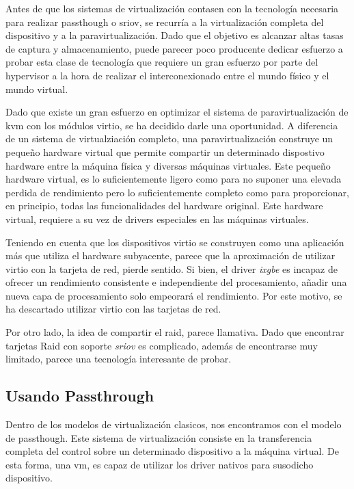 Antes de que los sistemas de virtualización contasen con la tecnología necesaria para realizar \gls{passthough} o \gls{sriov}, se recurría a la virtualización completa del dispositivo y a la paravirtualización. Dado que el objetivo es alcanzar altas tasas de captura y almacenamiento, puede parecer poco producente dedicar esfuerzo a probar esta clase de tecnología que requiere un gran esfuerzo por parte del hypervisor a la hora de realizar el interconexionado entre el mundo físico y el mundo virtual.

Dado que existe un gran esfuerzo en optimizar el sistema de paravirtualización de \gls{kvm} con los módulos \gls{virtio}, se ha decidido darle una oportunidad. A diferencia de un sistema de virtualziación completo, una paravirtualización construye un pequeño hardware virtual que permite compartir un determinado dispostivo hardware entre la máquina física y diversas máquinas virtuales. Este pequeño hardware virtual, es lo suficientemente ligero como para no suponer una elevada perdida de rendimiento pero lo suficientemente completo como para proporcionar, en principio, todas las funcionalidades del hardware original. Este hardware virtual, requiere a su vez de drivers especiales en las máquinas virtuales.

Teniendo en cuenta que los dispositivos \gls{virtio} se construyen como una aplicación más que utiliza el hardware subyacente, parece que la aproximación de utilizar \gls{virtio} con la tarjeta de red, pierde sentido. Si bien, el driver \textit{ixgbe} es incapaz de ofrecer un rendimiento consistente e independiente del procesamiento, añadir una nueva capa de procesamiento solo empeorará el rendimiento. Por este motivo, se ha descartado utilizar \gls{virtio} con las tarjetas de red.

Por otro lado, la idea de compartir el raid, parece llamativa. Dado que encontrar tarjetas Raid con soporte \textit{sriov} es complicado, además de encontrarse muy limitado, parece una tecnología interesante de probar.

\subsection{Usando Passthrough\label{sec:pt}}

Dentro de los modelos de virtualización clasicos, nos encontramos con el modelo de \gls{passthough}. Este sistema de virtualización consiste en la transferencia completa del control sobre un determinado dispositivo a la máquina virtual. De esta forma, una \gls{vm}, es capaz de utilizar los driver nativos para susodicho dispositivo.

